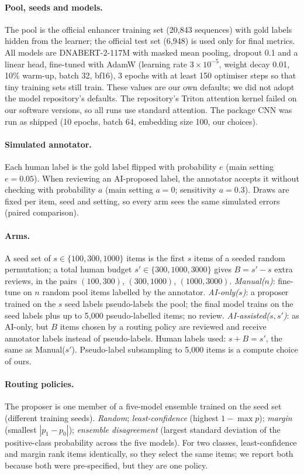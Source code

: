 \documentclass[11pt]{article}
\begin{document}
\paragraph{Pool, seeds and models.} The pool is the official enhancer training set (20{,}843 sequences) with gold labels hidden from the learner; the official test set (6{,}948) is used only for final metrics. All models are DNABERT-2-117M with masked mean pooling, dropout 0.1 and a linear head, fine-tuned with AdamW (learning rate $3\times10^{-5}$, weight decay 0.01, 10\% warm-up, batch 32, bf16), 3 epochs with at least 150 optimiser steps so that tiny training sets still train. These values are our own defaults; we did not adopt the model repository's defaults. The repository's Triton attention kernel failed on our software versions, so all runs use standard attention. The package CNN was run as shipped (10 epochs, batch 64, embedding size 100, our choices).

\paragraph{Simulated annotator.} Each human label is the gold label flipped with probability $e$ (main setting $e=0.05$). When reviewing an AI-proposed label, the annotator accepts it without checking with probability $a$ (main setting $a=0$; sensitivity $a=0.3$). Draws are fixed per item, seed and setting, so every arm sees the same simulated errors (paired comparison).

\paragraph{Arms.} A seed set of $s\in\{100,300,1000\}$ items is the first $s$ items of a seeded random permutation; a total human budget $s'\in\{300,1000,3000\}$ gives $B=s'-s$ extra reviews, in the pairs $(100,300)$, $(300,1000)$, $(1000,3000)$.
\emph{Manual($n$)}: fine-tune on $n$ random pool items labelled by the annotator.
\emph{AI-only($s$)}: a proposer trained on the $s$ seed labels pseudo-labels the pool; the final model trains on the seed labels plus up to 5{,}000 pseudo-labelled items; no review.
\emph{AI-assisted($s,s'$)}: as AI-only, but $B$ items chosen by a routing policy are reviewed and receive annotator labels instead of pseudo-labels. Human labels used: $s+B=s'$, the same as Manual($s'$). Pseudo-label subsampling to 5{,}000 items is a compute choice of ours.

\paragraph{Routing policies.} The proposer is one member of a five-model ensemble trained on the seed set (different training seeds). \emph{Random}; \emph{least-confidence} (highest $1-\max p$); \emph{margin} (smallest $|p_1-p_0|$); \emph{ensemble disagreement} (largest standard deviation of the positive-class probability across the five models). For two classes, least-confidence and margin rank items identically, so they select the same items; we report both because both were pre-specified, but they are one policy.
\end{document}
